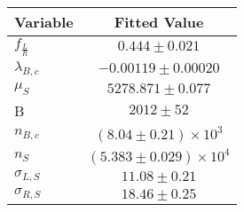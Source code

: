 \begin{tabular}[t]{lc}
\hline
Variable &Fitted Value\\
\hline\hline
$f_{\frac{L}{R}}$&$0.444\pm0.021$\\
\hline
$\lambda_{B,c}$&$-0.00119\pm0.00020$\\
\hline
$\mu_S$&$5278.871\pm0.077$\\
\hline
B&$2012\pm52$\\
\hline
$n_{B,c}$&$(8.04\pm0.21)\times 10^3$\\
\hline
$n_S$&$(5.383\pm0.029)\times 10^4$\\
\hline
$\sigma_{L, S}$&$11.08\pm0.21$\\
\hline
$\sigma_{R, S}$&$18.46\pm0.25$\\
\hline
\end{tabular}